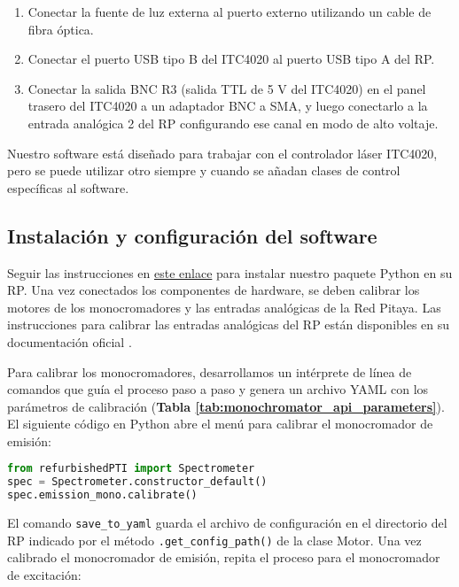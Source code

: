 \begin{enumerate}
    \item Conectar la fuente de luz externa al puerto externo utilizando un cable de fibra óptica.
    \item Conectar el puerto USB tipo B del ITC4020 al puerto USB tipo A del RP.
    \item Conectar la salida BNC R3 (salida TTL de 5 V del ITC4020) en el panel trasero del ITC4020 a un adaptador BNC a SMA, y luego conectarlo a la entrada analógica 2 del RP configurando ese canal en modo de alto voltaje.
\end{enumerate}

Nuestro software está diseñado para trabajar con el controlador láser ITC4020, pero se puede utilizar otro siempre y cuando se añadan clases de control específicas al software.

\subsection{Instalación y configuración del software} \label{apendice:instalacion}

Seguir las instrucciones en \href{https://github.com/tdinapoli/refurbishedPTI}{este enlace}\cite{napoli_tdinapoli_2024} para instalar nuestro paquete Python en su RP. 
Una vez conectados los componentes de hardware, se deben calibrar los motores de los monocromadores y las entradas analógicas de la Red Pitaya. 
Las instrucciones para calibrar las entradas analógicas del RP están disponibles en su documentación oficial \cite{rp_docs}.

Para calibrar los monocromadores, desarrollamos un intérprete de línea de comandos que guía el proceso paso a paso y genera un archivo YAML con los parámetros de calibración (\textbf{Tabla \ref{tab:monochromator_api_parameters}}). El siguiente código en Python abre el menú para calibrar el monocromador de emisión:

\begin{lstlisting}[language=Python]
from refurbishedPTI import Spectrometer
spec = Spectrometer.constructor_default()
spec.emission_mono.calibrate()
\end{lstlisting}

El comando \texttt{save\_to\_yaml} guarda el archivo de configuración en el directorio del RP indicado por el método \texttt{.get\_config\_path()} de la clase Motor. Una vez calibrado el monocromador de emisión, repita el proceso para el monocromador de excitación:

